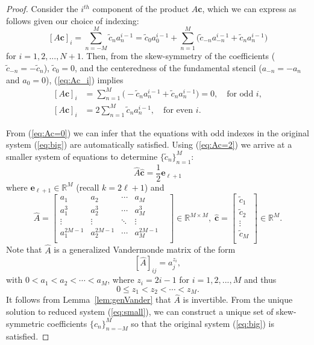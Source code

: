 \documentclass[12pt]{article}
\begin{document}
\begin{proof}
Consider the $i^{th}$ component of the product $A\mathbf c$, which we can express as follows given our choice of indexing:
\begin{equation}\label{eq:Ac_i}
    [A\mathbf c]_i 
    = \sum_{n=-M}^M \tilde c_n a_n^{i-1}
    = \tilde c_0 a_0^{i-1} 
    + \sum_{n=1}^M \Big( \tilde c_{-n}a_{-n}^{i-1}+\tilde c_n a_{n}^{i-1}\Big)
\end{equation}
for $i=1,2,...,N+1$.
Then, from the skew-symmetry of the coefficients ($\tilde c_{-n}=-\tilde c_n$), $\tilde c_0 = 0$, and the centeredness of the fundamental stencil ($a_{-n}=-a_n$ and $a_0=0$), (\ref{eq:Ac_i}) implies 
\begin{subequations}
\begin{align}
	[A\mathbf c]_i 
	&= \sum_{n=1}^M \Big( -\tilde c_{n}a_{n}^{i-1}+\tilde c_n a_{n}^{i-1}\Big) = 0, \quad \text{for odd } i, \label{eq:Ac=0}\\
	[A\mathbf c]_i 
	&= 2\sum_{n=1}^M \tilde c_n a_{n}^{i-1}, \quad \text{for even } i. \label{eq:Ac=2}
\end{align}
\end{subequations}

From (\ref{eq:Ac=0}) we can infer that the equations with odd indexes in the original system (\ref{eq:big}) are automatically satisfied.
Using (\ref{eq:Ac=2}) we arrive at a smaller system of equations to determine $\{\tilde c_n\}_{n=1}^M$:
\begin{equation}\label{eq:small}
    \hat A \hat{\mathbf{c}}=\frac{1}{2}\mathbf e_{\ell+1}
\end{equation}
where $\mathbf e_{\ell+1}\in\mathbb R^{M}$ (recall $k=2\ell+1$) and
\[
    \hat A = 
    \begin{bmatrix} 
        a_1 & a_{2} & \cdots & a_{M} \\
        a_1^3 &a_2^3 & \cdots & a_M^3\\
        \vdots & \vdots &\ddots &\vdots & \\
        a_1^{2M-1} &a_2^{2M-1} & \cdots & a_M^{2M-1}\\  
    \end{bmatrix}\in\mathbb R^{M\times M}, \;
    \hat{\mathbf c} =
    \begin{bmatrix}
        \tilde c_1\\
        \tilde c_2\\
        \vdots\\
        \tilde c_M \\
    \end{bmatrix}\in\mathbb R^M.
\]
Note that $\hat A$ is a generalized Vandermonde matrix of the form
\[
	[\hat A]_{ij} = a_j^{z_i},
\]
with $0<a_1<a_2<\cdots < a_M$, where $z_i = 2i-1$ for $i=1,2,...,M$ and thus
\[
	0 \le z_1 < z_2 < \cdots < z_M.
\]
It follows from Lemma~\ref{lem:genVander} that $\hat A$ is invertible.
From the unique solution to reduced system (\ref{eq:small}), we can construct a unique set of skew-symmetric coefficients $\{c_n\}_{n=-M}^M$ so that the original system (\ref{eq:big}) is satisfied.


\end{proof}
\end{document}
